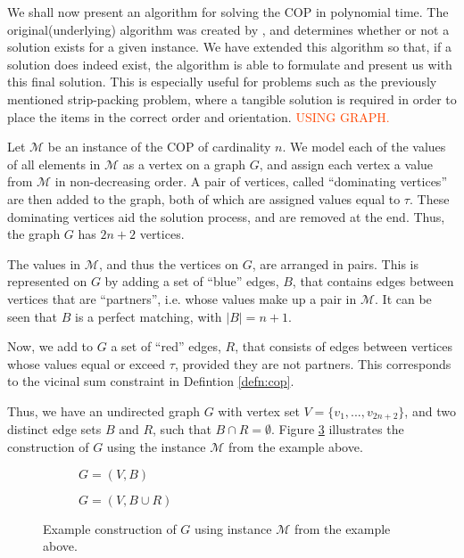 \documentclass[oribibl]{llncs}
\begin{document}
We shall now present an algorithm for solving the COP in polynomial time. The original(underlying) algorithm was created by \cite{becker2010}, and determines whether or not a solution exists for a given instance. We have extended this algorithm so that, if a solution does indeed exist, the algorithm is able to formulate and present us with this final solution. This is especially useful for problems such as the previously mentioned strip-packing problem, where a tangible solution is required in order to place the items in the correct order and orientation. \textcolor{OrangeRed}{USING GRAPH.}


Let $\mathcal{M}$ be an instance of the COP of cardinality $n$. We model each of the values of all elements in $\mathcal{M}$ as a vertex on a graph $G$, and assign each vertex a value from $\mathcal{M}$ in non-decreasing order. A pair of vertices, called ``dominating vertices'' are then added to the graph, both of which are assigned values equal to $\tau$. These dominating vertices aid the solution process, and are removed at the end. Thus, the graph $G$ has $2n+2$ vertices.

The values in $\mathcal{M}$, and thus the vertices on $G$, are arranged in pairs. This is represented on $G$ by adding a set of ``blue'' edges, $B$, that contains edges between vertices that are ``partners'', i.e. whose values make up a pair in $\mathcal{M}$. It can be seen that $B$ is a perfect matching, with $|B|= n+1$.

Now, we add to $G$ a set of ``red'' edges, $R$, that consists of edges between vertices whose values equal or exceed $\tau$, provided they are not partners. This corresponds to the vicinal sum constraint in Defintion \ref{defn:cop}. 

Thus, we have an undirected graph $G$ with vertex set $V = \{v_1, ..., v_{2n+2}\}$, and two distinct edge sets $B$ and $R$, such that $B \cap R = \emptyset$. Figure \ref{fig:partners/threshold} illustrates the construction of $G$ using the instance $\mathcal{M}$ from the example above. 


\begin{figure}	
\centering
\begin{subfigure}[h]{0.45\textwidth}
	
	\caption{$G = (V, B)$}	
	\label{fig:partners}
\end{subfigure} \hspace{40pt}
\begin{subfigure}[h]{0.45\textwidth}
	
	\caption{$G=(V, B \cup R)$}	
	\label{fig:threshold}
\end{subfigure}
\caption{Example construction of $G$ using instance $\mathcal{M}$ from the example above.}
\label{fig:partners/threshold}
\end{figure}
\end{document}
